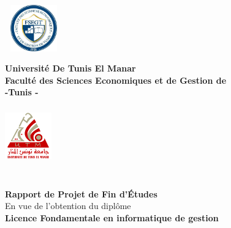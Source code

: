 \begin{titlepage}
\begin{center}
	\begin{minipage}{2.5cm}
	\begin{center}
		\includegraphics[width=2.5cm,height=2cm]{logo-ensak.png}
		
    \end{center}
\end{minipage}\hfill
\begin{minipage}{8cm}
	\begin{center}
	\textbf{ Université De Tunis El Manar}\\[0.1cm]
    \textbf{\uppercase{F}aculté des Sciences Economiques
    	et de Gestion de}\\[0.1cm]
    \textbf{-Tunis -}
\end{center}
\end{minipage}\hfill
\begin{minipage}{2cm}
	\begin{center}
	\includegraphics[width=2cm,height=2.5cm]{uni.png}
	\end{center}

\end{minipage}
\textsc{\Large }\\[1.5cm]
{\large \bfseries Rapport de  Projet de Fin d'\uppercase{é}tudes}\\[0.5cm]
{\large En vue de l'obtention du diplôme}\\[0.5cm]

{\large \bfseries Licence Fondamentale en informatique de gestion}
\textsc{\Large }\\[2cm]


\end{center}
\end{titlepage}
